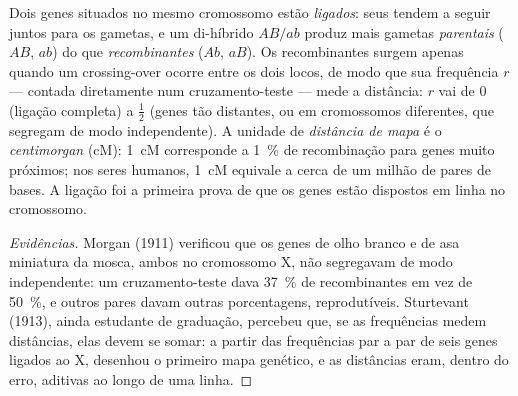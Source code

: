 \begin{definition}\label{def:b2:meiosis-heredity:linkage}
Dois genes situados no mesmo cromossomo estão \emph{ligados}: seus
 tendem a seguir juntos para os gametas, e um di-híbrido
$AB/ab$ produz mais gametas \emph{parentais} ($AB$, $ab$) do que
\emph{recombinantes} ($Ab$, $aB$). Os recombinantes surgem apenas
quando um crossing-over ocorre entre os dois locos, de modo que sua
frequência $r$ --- contada diretamente num cruzamento-teste --- mede a
distância: $r$ vai de 0 (ligação completa) a $\tfrac12$ (genes tão
distantes, ou em cromossomos diferentes, que segregam de modo
independente). A unidade de \emph{distância de mapa} é o
\emph{centimorgan} (cM): \qty{1}{cM}
corresponde a \qty{1}{\%} de recombinação para genes muito próximos;
nos seres humanos, \qty{1}{cM} equivale a cerca de um milhão de pares
de bases. A ligação foi a primeira prova de que os genes estão
dispostos em linha no cromossomo.
\end{definition}
\begin{proof}[Evidências]
Morgan (1911) verificou que os genes de olho branco e de asa
miniatura da mosca, ambos no cromossomo X, não segregavam de modo
independente: um cruzamento-teste dava \qty{37}{\%} de recombinantes
em vez de \qty{50}{\%}, e outros pares davam outras porcentagens,
reprodutíveis. Sturtevant (1913), ainda estudante de graduação,
percebeu que, se as frequências medem distâncias, elas devem se
somar: a partir das frequências par a par de seis genes ligados ao X,
desenhou o primeiro mapa genético, e as distâncias eram, dentro do
erro, aditivas ao longo de uma linha.
\end{proof}


